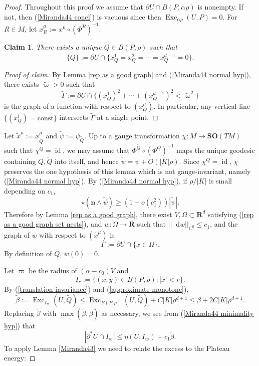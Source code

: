 \documentclass[reqno,10pt]{amsart}
\newcommand{\RR}{\mathbf{R}}
\newcommand{\SpOrth}{\mathbf{SO}}
\DeclareMathOperator{\Exc}{Exc}
\DeclareMathOperator{\id}{id}
\newcommand*\dif{\mathop{}\!\mathrm{d}}
\newcommand{\normal}{\mathbf n}
\newtheorem{claim}{Claim}[theorem]
\theoremstyle{definition}
\numberwithin{equation}{section}
\begin{document}
\begin{proof}
Throughout this proof we assume that $\partial U \cap B(P, \alpha \rho)$ is nonempty.
If not, then (\ref{Miranda44 concl}) is vacuous since then $\Exc_{\alpha \rho} (U, P) = 0$.
For $R \in M$, let $x^\mu_R := x^\mu \circ (\Phi^R)^{-1}$.

\begin{claim}
There exists a unique $\tilde Q \in B(P, \rho)$ such that
$$\{\tilde Q\} := \partial U \cap \{x^1_Q = x^2_Q = \cdots = x^{d - 1}_Q = 0\}.$$
\end{claim}
\begin{proof}[Proof of claim]
By Lemma \ref{rep as a good graph} and (\ref{Miranda44 normal hyp}), there exists $\tilde \varpi > 0$ such that
$$\tilde \Gamma := \partial U \cap \{(x^1_Q)^2 + \cdots + (x^{d - 1}_Q)^2 < \tilde \varpi^2\}$$
is the graph of a function with respect to $(x^\mu_Q)$. In particular, any vertical line $\{(x^i_Q) = \text{const}\}$ intersects $\tilde \Gamma$ at a single point.
\end{proof}

Let $\tilde x^\mu := x^\mu_{\tilde Q}$ and $\tilde \psi := \psi_{\tilde Q}$.
Up to a gauge transformation $\chi: M \to \SpOrth(TM)$ such that $\chi^Q = \id$, we may assume that $\Phi^{\tilde Q} \circ (\Phi^Q)^{-1}$ maps the unique geodesic containing $Q, \tilde Q$ into itself, and hence $\tilde \psi = \psi + O(|K| \rho)$.
Since $\chi^Q = \id$, $\chi$ preserves the one hypothesis of this lemma which is not gauge-invariant, namely (\ref{Miranda44 normal hyp}).
By (\ref{Miranda44 normal hyp}), if $\rho/|K|$ is small depending on $c_1$,
$$\star(\normal \wedge \tilde \psi) \geq (1 - o(c_1^2)) |\tilde \psi|.$$
Therefore by Lemma \ref{rep as a good graph}, there exist $V, \Omega \subset \RR^d$ satisfying (\ref{rep as a good graph set nests}), and $w: \Omega \to \RR$ such that $||\dif w||_{C^0} \leq c_1$, and the graph of $w$ with respect to $(\tilde x^\mu)$ is
$$\Gamma := \partial U \cap \{\tilde x \in \Omega\}.$$
By definition of $\tilde Q$, $w(0) = 0$.

Let $\varpi$ be the radius of $(\alpha - c_0) V$ and 
$$I_r := \{(\tilde x, \tilde y) \in B(P, \rho): |\tilde x| < r\}.$$
By (\ref{translation invariance}) and (\ref{approximate monotone}),
$$\tilde \beta := \Exc_{I_\varpi} (U, \tilde Q) \leq \Exc_{B(P, \rho)} (U, \tilde Q) + C|K| \rho^{d + 1} \leq \beta + 2C|K| \rho^{d + 1}.$$
Replacing $\tilde \beta$ with $\max(\tilde \beta, \beta)$ as necessary, we see from (\ref{Miranda44 minimality hyp}) that
$$|\partial^* U \cap I_\varpi| \leq \eta(U, I_\varpi) + c_1 \tilde \beta.$$
To apply Lemma \ref{Miranda43} we need to relate the excess to the Plateau energy:


\end{proof}
\end{document}

